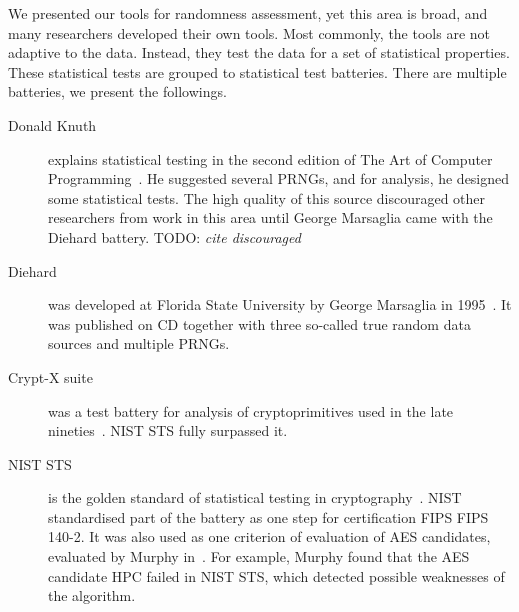\documentclass[
  print, %
  Table,   %
  nolof,     %
  nolot,     %
  11pt, %
  oneside  %
]{fithesis3}
\newcommand{\todo}[1]{TODO: \textit{#1}}
\begin{document}
We presented our tools for randomness assessment, yet this area is broad, and many researchers developed their own tools. Most commonly, the tools are not adaptive to the data. Instead, they test the data for a set of statistical properties. These statistical tests are grouped to statistical test batteries. There are multiple batteries, we present the followings.


\begin{description}
    \item[Donald Knuth] explains statistical testing in the second edition of The Art of Computer Programming~\cite{knuth1969vol}. He suggested several PRNGs, and for analysis, he designed some statistical tests. The high quality of this source discouraged other researchers from work in this area until George Marsaglia came with the Diehard battery. \todo{cite discouraged} %
    \item[Diehard] was developed at Florida State University by George Marsaglia in 1995~\cite{marsaglia1996diehard}. It was published on CD together with three so-called true random data sources and multiple PRNGs. %
    \item[Crypt-X suite] was a test battery for analysis of cryptoprimitives used in the late nineties~\cite{cryptxs}. NIST STS fully surpassed it. %
    \item[NIST STS] is the golden standard of statistical testing in cryptography~\cite{rukhin2001statistical}. NIST standardised part of the battery as one step for certification FIPS FIPS 140-2. It was also used as one criterion of evaluation of AES candidates, evaluated by Murphy in~\cite{murphy2000power}. For example, Murphy found that the AES candidate HPC failed in NIST STS, which detected possible weaknesses of the algorithm.


\end{description}
\end{document}
